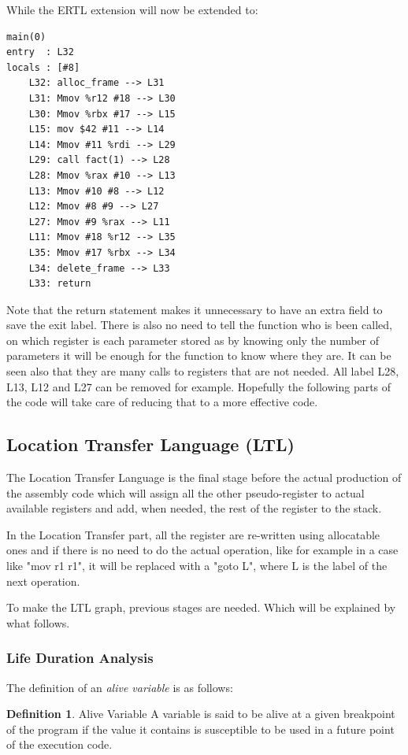 \documentclass[conference]{IEEEtran}
\theoremstyle{definition}
\newtheorem{definition}{Definition}[section]
\begin{document}
While the ERTL extension will now be extended to:

\begin{lstlisting}
main(0)
entry  : L32
locals : [#8]
	L32: alloc_frame --> L31
	L31: Mmov %r12 #18 --> L30
	L30: Mmov %rbx #17 --> L15
	L15: mov $42 #11 --> L14
	L14: Mmov #11 %rdi --> L29
	L29: call fact(1) --> L28
	L28: Mmov %rax #10 --> L13
	L13: Mmov #10 #8 --> L12
	L12: Mmov #8 #9 --> L27
	L27: Mmov #9 %rax --> L11
	L11: Mmov #18 %r12 --> L35
	L35: Mmov #17 %rbx --> L34
	L34: delete_frame --> L33
	L33: return
\end{lstlisting}

Note that the return statement makes it unnecessary to have an extra field to save the exit label. There is also no need to tell the function who is been called, on which register is each parameter stored as by knowing only the number of parameters it will be enough for the function to know where they are. It can be seen also that they are many calls to registers that are not needed. All label L28, L13, L12 and L27 can be removed for example. Hopefully the following parts of the code will take care of reducing that to a more effective code.

\subsection{Location Transfer Language (LTL)}

The Location Transfer Language is the final stage before the actual production of the assembly code which will assign all the other pseudo-register to actual available registers and add, when needed, the rest of the register to the stack.

In the Location Transfer part, all the register are re-written using allocatable ones and if there is no need to do the actual operation, like for example in a case like "mov r1 r1", it will be replaced with a "goto L", where L is the label of the next operation.

To make the LTL graph, previous stages are needed. Which will be explained by what follows.

\subsubsection{Life Duration Analysis}

The definition of an \textit{alive variable} is as follows:

\theoremstyle{definition}
\begin{definition}{Alive Variable}
	A variable is said to be alive at a given breakpoint of the program if the value it contains is susceptible to be used in a future point of the execution code.
\end{definition}
\end{document}
